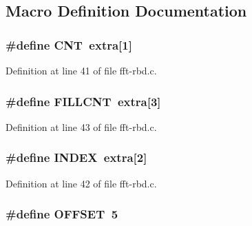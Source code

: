 \subsection{Macro Definition Documentation}
\subsubsection[{\texorpdfstring{C\+NT}{CNT}}]{\setlength{\rightskip}{0pt plus 5cm}\#define C\+NT~extra\mbox{[}1\mbox{]}}\hypertarget{fft-rbd_8c_a6a4288add566c8d9c96f7cb0dc661c66}{}\label{fft-rbd_8c_a6a4288add566c8d9c96f7cb0dc661c66}


Definition at line 41 of file fft-\/rbd.\+c.

\subsubsection[{\texorpdfstring{F\+I\+L\+L\+C\+NT}{FILLCNT}}]{\setlength{\rightskip}{0pt plus 5cm}\#define F\+I\+L\+L\+C\+NT~extra\mbox{[}3\mbox{]}}\hypertarget{fft-rbd_8c_a37dfe203b33a1b857120715d29cd27fb}{}\label{fft-rbd_8c_a37dfe203b33a1b857120715d29cd27fb}


Definition at line 43 of file fft-\/rbd.\+c.

\subsubsection[{\texorpdfstring{I\+N\+D\+EX}{INDEX}}]{\setlength{\rightskip}{0pt plus 5cm}\#define I\+N\+D\+EX~extra\mbox{[}2\mbox{]}}\hypertarget{fft-rbd_8c_ac6885dbfb371c33e523c7fb046118b36}{}\label{fft-rbd_8c_ac6885dbfb371c33e523c7fb046118b36}


Definition at line 42 of file fft-\/rbd.\+c.

\subsubsection[{\texorpdfstring{O\+F\+F\+S\+ET}{OFFSET}}]{\setlength{\rightskip}{0pt plus 5cm}\#define O\+F\+F\+S\+ET~5}\hypertarget{fft-rbd_8c_a21005f9f4e2ce7597c5eb4351816d7e2}{}\label{fft-rbd_8c_a21005f9f4e2ce7597c5eb4351816d7e2}


